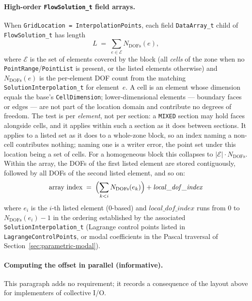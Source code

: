 \documentclass[11pt,letterpaper]{article}
\newif\ifvfourdraft
\newcommand{\vfour}[1]{\ifvfourdraft\textcolor{v4violet}{#1}\else#1\fi}
\newcommand{\vfourmark}{\ifvfourdraft\textcolor{v4violet}{\textbf{[v4]}}\ \fi}
\begin{document}
\paragraph{High-order \texttt{FlowSolution\_t} field arrays.}
When \texttt{GridLocation = InterpolationPoints}, each field \texttt{DataArray\_t} child of
\texttt{FlowSolution\_t} has length
\begin{equation*}
  L \;=\; \sum_{e \in \mathcal{E}} N_\mathrm{DOFs}(e),
\end{equation*}
where $\mathcal{E}$ is the set of elements covered by the block
(\vfour{all \emph{cells} of the zone} when no
\texttt{PointRange}\allowbreak/\texttt{PointList} is present, or the listed elements
otherwise) and $N_\mathrm{DOFs}(e)$ is the per-element DOF count from the
matching \texttt{SolutionInterpolation\_t} for element~$e$.
\vfour{A cell is an element whose dimension equals the base's
\texttt{CellDimension}; lower-dimensional elements --- boundary faces or edges ---
are not part of the location domain and contribute no degrees of freedom.  The
test is per \emph{element}, not per section: a \texttt{MIXED} section may hold
faces alongside cells, and it applies within such a section as it does between
sections.  It applies to a listed set as it does to a whole-zone block, so an
index naming a non-cell contributes nothing; naming one is a writer error, the
point set under this location being a set of cells.}  For a homogeneous block this
collapses to $|\mathcal{E}| \cdot N_\mathrm{DOFs}$.  Within the array, the DOFs of
the first listed element are stored contiguously, followed by all DOFs of the
second listed element, and so on:
\begin{equation*}
  \text{array index} \;=\;
    \Bigl( \sum_{k < i} N_\mathrm{DOFs}(e_k) \Bigr) + \mathit{local\_dof\_index}
\end{equation*}
where $e_i$ is the $i$-th listed element (0-based) and $\mathit{local\_dof\_index}$
runs from $0$ to $N_\mathrm{DOFs}(e_i)-1$ in the ordering established by the associated
\texttt{SolutionInterpolation\_t} (Lagrange control points listed in
\texttt{LagrangeControlPoints}, or modal coefficients in the Pascal traversal of
Section~\ref{sec:parametric-modal}).

\paragraph{\vfourmark Computing the offset in parallel (informative).}
This paragraph adds no requirement; it records a consequence of the layout above
for implementers of collective I/O.
\end{document}
